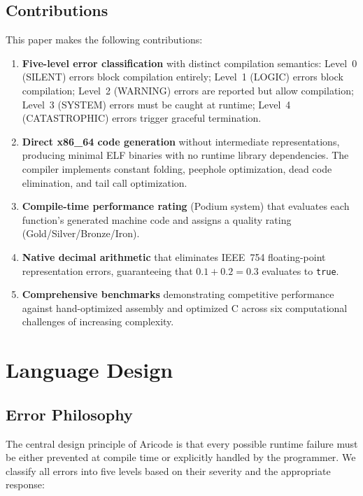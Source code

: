 \documentclass[11pt,a4paper]{article}
\begin{document}
\subsection{Contributions}

This paper makes the following contributions:

\begin{enumerate}
    \item \textbf{Five-level error classification} with distinct compilation semantics: Level~0 (SILENT) errors block compilation entirely; Level~1 (LOGIC) errors block compilation; Level~2 (WARNING) errors are reported but allow compilation; Level~3 (SYSTEM) errors must be caught at runtime; Level~4 (CATASTROPHIC) errors trigger graceful termination.

    \item \textbf{Direct x86\_64 code generation} without intermediate representations, producing minimal ELF binaries with no runtime library dependencies. The compiler implements constant folding, peephole optimization, dead code elimination, and tail call optimization.

    \item \textbf{Compile-time performance rating} (Podium system) that evaluates each function's generated machine code and assigns a quality rating (Gold/Silver/Bronze/Iron).

    \item \textbf{Native decimal arithmetic} that eliminates IEEE~754 floating-point representation errors, guaranteeing that $0.1 + 0.2 = 0.3$ evaluates to \texttt{true}.

    \item \textbf{Comprehensive benchmarks} demonstrating competitive performance against hand-optimized assembly and optimized C across six computational challenges of increasing complexity.
\end{enumerate}

\section{Language Design}
\label{sec:design}

\subsection{Error Philosophy}

The central design principle of Aricode is that every possible runtime failure must be either prevented at compile time or explicitly handled by the programmer. We classify all errors into five levels based on their severity and the appropriate response:
\end{document}
